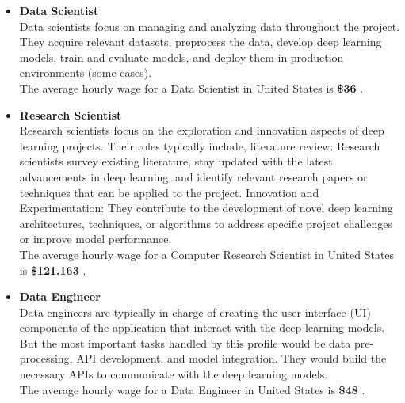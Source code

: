 \begin{itemize}
    \item \textbf{Data Scientist} \\

Data scientists focus on managing and analyzing data throughout the project. They acquire relevant datasets, preprocess the data, develop deep learning models, train and evaluate models, and deploy them in production environments (some cases). \\

The average hourly wage for a Data Scientist in United States is \textbf{\$36} \cite{SalaryDataScientist}. \\

\item \textbf{Research Scientist} \\

Research scientists focus on the exploration and innovation aspects of deep learning projects. Their roles typically include, literature review: Research scientists survey existing literature, stay updated with the latest advancements in deep learning, and identify relevant research papers or techniques that can be applied to the project. Innovation and Experimentation: They contribute to the development of novel deep learning architectures, techniques, or algorithms to address specific project challenges or improve model performance. \\

The average hourly wage for a Computer Research Scientist in United States is \textbf{\$121.163} \cite{SalaryResearchScientist}. \\

\item \textbf{Data Engineer} \\

Data engineers are typically in charge of creating the user interface (UI) components of the application that interact with the deep learning models. But the most important tasks handled by this profile would be data pre-processing, API development, and model integration. They would build the necessary APIs to communicate with the deep learning models. \\

The average hourly wage for a Data Engineer in United States is \textbf{\$48} \cite{SalaryDataEnginner}. \\

\end{itemize}

